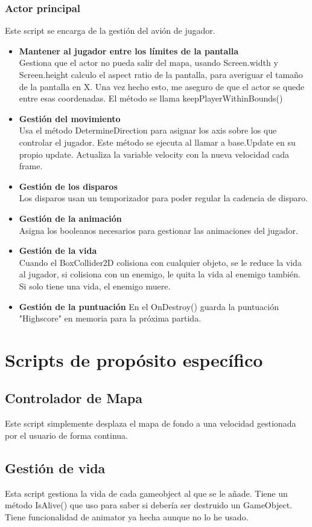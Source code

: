 \documentclass[titlepage, 4apaper]{article}
\begin{document}
\subsubsection{Actor principal}
Este script se encarga de la gestión del avión de jugador. 
\begin{itemize}
	\item \textbf{Mantener al jugador entre los límites de la pantalla}\\Gestiona que el actor no pueda salir del mapa, usando Screen.width y Screen.height calculo el aspect ratio de la pantalla, para averiguar el tamaño de la pantalla en X. Una vez hecho esto, me aseguro de que el actor se quede entre esas coordenadas. El método se llama keepPlayerWithinBounds()
	\item \textbf{Gestión del movimiento}\\Usa el método DetermineDirection para asignar los axis sobre los que controlar el jugador. Este método se ejecuta al llamar a base.Update en su propio update. Actualiza la variable velocity con la nueva velocidad cada frame.
	\item \textbf{Gestión de los disparos}\\Los disparos usan un temporizador para poder regular la cadencia de disparo.
	\item \textbf{Gestión de la animación}\\Asigna los booleanos necesarios para gestionar las animaciones del jugador.
	\item \textbf{Gestión de la vida}\\Cuando el BoxCollider2D colisiona con cualquier objeto, se le reduce la vida al jugador, si colisiona con un enemigo, le quita la vida al enemigo también. Si solo tiene una vida, el enemigo muere.
	\item \textbf{Gestión de la puntuación} En el OnDestroy() guarda la puntuación "Highscore" en memoria para la próxima partida.
\end{itemize}
\section{Scripts de propósito específico}
\subsection{Controlador de Mapa}
Este script simplemente desplaza el mapa de fondo a una velocidad gestionada por el usuario de forma continua.
\subsection{Gestión de vida}
Esta script gestiona la vida de cada gameobject al que se le añade. Tiene un método IsAlive() que uso para saber si debería ser destruido un GameObject. Tiene funcionalidad de animator ya hecha aunque no lo he usado.
\end{document}
